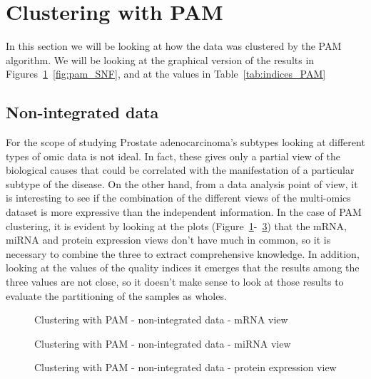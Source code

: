 \section{Clustering with PAM}\label{results_pam}
In this section we will be looking at how the data was clustered by the PAM algorithm. We will be looking at the graphical version of the results in Figures~\ref{fig:pam_1}~\ref{fig:pam_SNF}, and at the values in Table~\ref{tab:indices_PAM}
\subsection*{Non-integrated data}\label{pam_nonIntegrated}
For the scope of studying Prostate adenocarcinoma's subtypes looking at different types of omic data is not ideal. In fact, these gives only a partial view of the biological causes that could be correlated with the manifestation of a particular subtype of the disease. On the other hand, from a data analysis point of view, it is interesting to see if the combination of the different views of the multi-omics dataset is more expressive than the independent information. In the case of PAM clustering, it is evident by looking at the plots (Figure~\ref{fig:pam_1}-~\ref{fig:pam_3}) that the mRNA, miRNA and protein expression views don't have much in common, so it is necessary to combine the three to extract comprehensive knowledge. In addition, looking at the values of the quality indices it emerges that the results among the three values are not close, so it doesn't make sense to look at those results to evaluate the partitioning of the samples as wholes.
\begin{figure}[!]\label{fig:pam_1}
    \centering
    \caption{Clustering with PAM - non-integrated data - mRNA view}
\end{figure}
\begin{figure}[!]\label{fig:pam_2}
    \centering
    \caption{Clustering with PAM - non-integrated data - miRNA view}
\end{figure}
\begin{figure}[!]\label{fig:pam_3}
    \centering
    \caption{Clustering with PAM - non-integrated data - protein expression view}
\end{figure}

